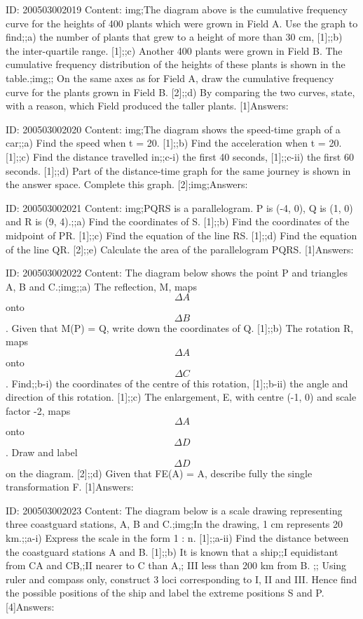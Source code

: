 \documentclass{article}
\begin{document}
ID: 200503002019
Content:
img;The diagram above is the cumulative frequency curve for the heights of 400 plants which were grown in Field A. Use the graph to find;;a) the number of plants that grew to a height of more than 30 cm, [1];;b) the inter-quartile range. [1];;c) Another 400 plants were grown in Field B. The cumulative frequency distribution of the heights of these plants is shown in the table.;img;; On the same axes as for Field A, draw the cumulative frequency curve for the plants grown in Field B. [2];;d) By comparing the two curves, state, with a reason, which Field produced the taller plants. [1]Answers:

ID: 200503002020
Content:
img;The diagram shows the speed-time graph of a car;;a) Find the speed when t = 20. [1];;b) Find the acceleration when t = 20. [1];;c) Find the distance travelled in;;c-i) the first 40 seconds, [1];;c-ii) the first 60 seconds. [1];;d) Part of the distance-time graph for the same journey is shown in the answer space. Complete this graph. [2];img;Answers:

ID: 200503002021
Content:
img;PQRS is a parallelogram. P is (-4, 0), Q is (1, 0) and R is (9, 4).;;a) Find the coordinates of S. [1];;b) Find the coordinates of the midpoint of PR. [1];;c) Find the equation of the line RS. [1];;d) Find the equation of the line QR. [2];;e) Calculate the area of the parallelogram PQRS. [1]Answers:

ID: 200503002022
Content:
The diagram below shows the point P and triangles A, B and C.;img;;a) The reflection, M, maps $$\Delta  A$$ onto $$\Delta  B$$. Given that M(P) = Q, write down the coordinates of Q. [1];;b) The rotation R, maps $$\Delta  A$$  onto $$\Delta  C$$. Find;;b-i) the coordinates of the centre of this rotation, [1];;b-ii) the angle and direction of this rotation. [1];;c) The enlargement, E, with centre (-1, 0) and scale factor -2, maps $$\Delta  A$$  onto $$\Delta  D$$. Draw and label $$\Delta  D$$  on the diagram. [2];;d) Given that FE(A) = A, describe fully the single transformation F. [1]Answers:

ID: 200503002023
Content:
The diagram below is a scale drawing representing three coastguard stations, A, B and C.;img;In the drawing, 1 cm represents 20 km.;;a-i) Express the scale in the form 1 : n. [1];;a-ii) Find the distance between the coastguard stations A and B. [1];;b) It is known that a ship;;I	equidistant from CA and CB,;II	nearer to C than A,; III	less than 200 km from B. ;; Using ruler and compass only, construct 3 loci corresponding to I, II and III. Hence find the possible positions of the ship and label the extreme positions S and P. [4]Answers:
\end{document}
